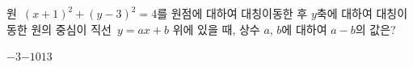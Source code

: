 원~$(x+1)^2+(y-3)^2=4$를 원점에 대하여 대칭이동한 후 $y$축에 대하여 대칭이동한 원의 중심이 직선~$y=ax+b$ 위에 있을 때, 상수 $a$, $b$에 대하여 $a-b$의 값은?
\begin{choices32}{$-3$}{$-1$}{$0$}{$1$}{$3$}\end{choices32}
